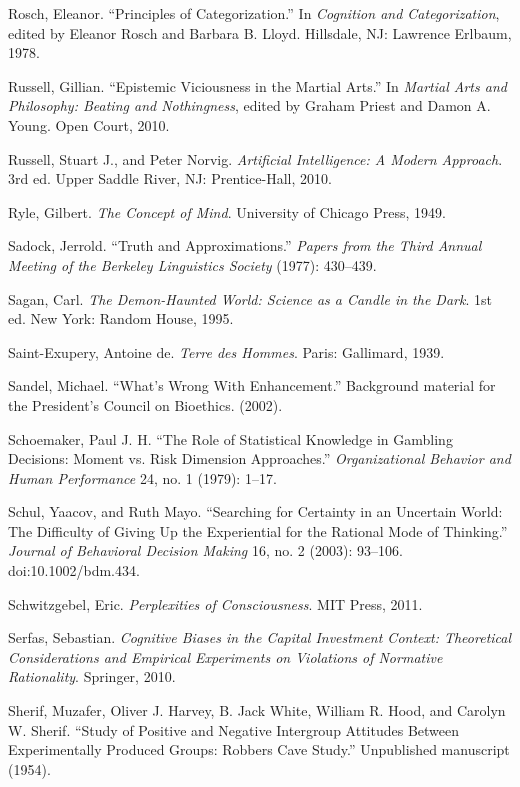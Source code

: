 \documentclass[letterpaper]{book}
\begin{document}
{
 Rosch, Eleanor. ``Principles of
Categorization.'' In \textit{Cognition and
Categorization}, edited by Eleanor Rosch and Barbara B. Lloyd.
Hillsdale, NJ: Lawrence Erlbaum, 1978.}

{
 Russell, Gillian. ``Epistemic Viciousness in the
Martial Arts.'' In \textit{Martial Arts and
Philosophy: Beating and Nothingness}, edited by Graham Priest and Damon
A. Young. Open Court, 2010.}

{
 Russell, Stuart J., and Peter Norvig. \textit{Artificial
Intelligence: A Modern Approach}. 3rd ed. Upper Saddle River, NJ:
Prentice-Hall, 2010.}

{
 Ryle, Gilbert. \textit{The Concept of Mind}. University of Chicago
Press, 1949.}

{
 Sadock, Jerrold. ``Truth and
Approximations.'' \textit{Papers from the Third
Annual Meeting of the Berkeley Linguistics Society} (1977): 430--439.}

{
 Sagan, Carl. \textit{The Demon-Haunted World: Science as a Candle
in the Dark}. 1st ed. New York: Random House, 1995.}

{
 Saint-Exupery, Antoine de. \textit{Terre des Hommes}. Paris:
Gallimard, 1939.}

{
 Sandel, Michael. ``What's Wrong
With Enhancement.'' Background material for the
President's Council on Bioethics. (2002).}

{
 Schoemaker, Paul J. H. ``The Role of Statistical
Knowledge in Gambling Decisions: Moment vs. Risk Dimension
Approaches.'' \textit{Organizational Behavior and
Human Performance} 24, no. 1 (1979): 1--17.}

{
 Schul, Yaacov, and Ruth Mayo. ``Searching for
Certainty in an Uncertain World: The Difficulty of Giving Up the
Experiential for the Rational Mode of Thinking.''
\textit{Journal of Behavioral Decision Making} 16, no. 2 (2003):
93--106. doi:10.1002/bdm.434.}

{
 Schwitzgebel, Eric. \textit{Perplexities of Consciousness}. MIT
Press, 2011.}

{
 Serfas, Sebastian. \textit{Cognitive Biases in the Capital
Investment Context: Theoretical Considerations and Empirical
Experiments on Violations of Normative Rationality}. Springer, 2010.}

{
 Sherif, Muzafer, Oliver J. Harvey, B. Jack White, William R. Hood,
and Carolyn W. Sherif. ``Study of Positive and
Negative Intergroup Attitudes Between Experimentally Produced Groups:
Robbers Cave Study.'' Unpublished manuscript (1954).}
\end{document}

